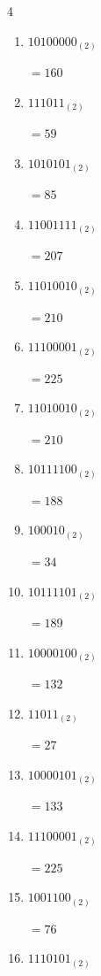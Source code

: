 \begin{multicols}{4}
\begin{enumerate}
        $=212$

  \item $10100000_{(2)}$

        $=160$

  \item $111011_{(2)}$

        $=59$

  \item $1010101_{(2)}$

        $=85$

  \item $11001111_{(2)}$

        $=207$

  \item $11010010_{(2)}$

        $=210$

  \item $11100001_{(2)}$

        $=225$

  \item $11010010_{(2)}$

        $=210$

  \item $10111100_{(2)}$

        $=188$

  \item $100010_{(2)}$

        $=34$

  \item $10111101_{(2)}$

        $=189$

  \item $10000100_{(2)}$

        $=132$

  \item $11011_{(2)}$

        $=27$

  \item $10000101_{(2)}$

        $=133$

\columnbreak %

\resetques

  \item $11100001_{(2)}$

        $=225$

  \item $1001100_{(2)}$

        $=76$

  \item $1110101_{(2)}$


\end{enumerate}
\end{multicols}
